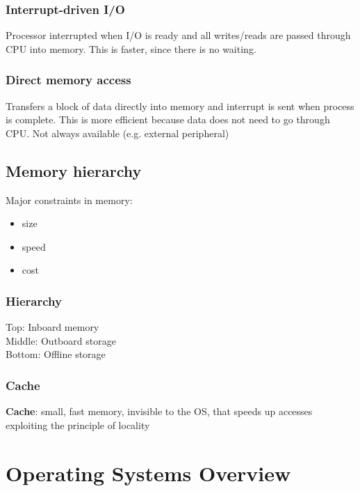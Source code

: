 \documentclass[]{article}
\theoremstyle{definition}
\begin{document}
			\subsubsection{Interrupt-driven I/O}
				Processor interrupted when I/O is ready and all writes/reads are passed through CPU into memory. This is faster, since there is no waiting. 
			\subsubsection{Direct memory access}
				Transfers a block of data directly into memory and interrupt is sent when process is complete. This is more efficient because data does not need to go through CPU. Not always available (e.g. external peripheral) 
		\subsection{Memory hierarchy}
			Major constraints in memory:
			\begin{itemize}
				\item size
				\item speed
				\item cost
			\end{itemize}
			
			\subsubsection{Hierarchy}
			Top: Inboard memory \\
			Middle: Outboard storage \\
			Bottom: Offline storage \\

			\subsubsection{Cache}
				\textbf{Cache}: small, fast memory, invisible to the OS, that speeds up accesses exploiting the principle of locality
	
	\section{Operating Systems Overview}
\end{document}
